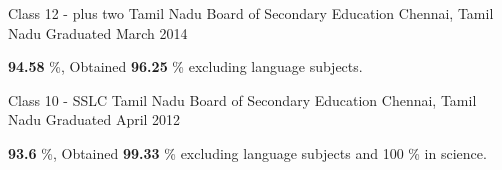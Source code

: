 \begin{cventries}

{
\cventry
{Class 12 - plus two} %
{Tamil Nadu Board of Secondary Education} %
{ Chennai, Tamil Nadu} %
{ Graduated March 2014} %
{ %
\begin{cvitems}
\item { \textbf{94.58} \%, Obtained \textbf{96.25} \% excluding language subjects.}
\end{cvitems}
}
}


{

\cventry
{Class 10 - SSLC} %
{Tamil Nadu Board of Secondary Education} %
{ Chennai, Tamil Nadu} %
{ Graduated April 2012} %
{ %
	\begin{cvitems}
		\item {\textbf{93.6} \%, Obtained \textbf{99.33} \% excluding language subjects and 100 \% in science.}
	\end{cvitems}
}

}
\end{cventries}
